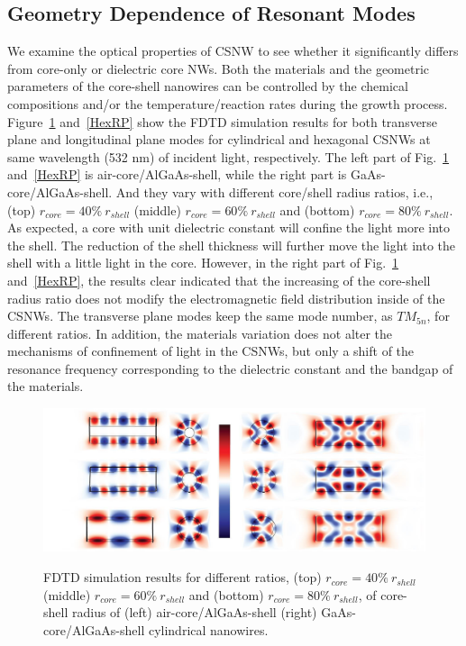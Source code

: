\subsection{Geometry Dependence of Resonant Modes}

We examine the optical properties of CSNW to see whether it significantly
differs from core-only or dielectric core NWs. Both the materials and the
geometric parameters of the core-shell nanowires can be controlled by the
chemical compositions and/or the temperature/reaction rates during the growth
process. Figure~\ref{CylinRP} and~\ref{HexRP} show the FDTD simulation results
for both transverse plane and longitudinal plane modes for cylindrical and
hexagonal CSNWs at same wavelength (532 nm) of incident light, respectively.
The left part of Fig.~\ref{CylinRP} and~\ref{HexRP} is air-core/AlGaAs-shell,
while the right part is GaAs-core/AlGaAs-shell. And they vary with different
core/shell radius ratios, i.e., (top) $r_{core} = 40\%\ r_{shell}$ (middle)
$r_{core} = 60\%\ r_{shell}$ and (bottom) $r_{core} = 80\%\ r_{shell}$. As
expected, a core with unit dielectric constant will confine the light more into
the shell. The reduction of the shell thickness will further move the light
into the shell with a little light in the core. However, in the right part of
Fig.~\ref{CylinRP} and~\ref{HexRP}, the results clear indicated that the
increasing of the core-shell radius ratio does not modify the electromagnetic
field distribution inside of the CSNWs. The transverse plane modes keep the
same mode number, as ${TM}_{5n}$, for different ratios. In addition, the
materials variation does not alter the mechanisms of confinement of light in
the CSNWs, but only a shift of the resonance frequency corresponding to the
dielectric constant and the bandgap of the materials.

\begin{figure}
  \caption{FDTD simulation results for different ratios, (top) $r_{core} = 40\%\ r_{shell}$ (middle) $r_{core} = 60\%\ r_{shell}$ and (bottom) $r_{core} = 80\%\ r_{shell}$, of core-shell radius of (left) air-core/AlGaAs-shell (right) GaAs-core/AlGaAs-shell cylindrical nanowires.}
  \centering
  \includegraphics[width=\textwidth]{pictures/LM/CylinRP}
  \label{CylinRP}
\end{figure}

